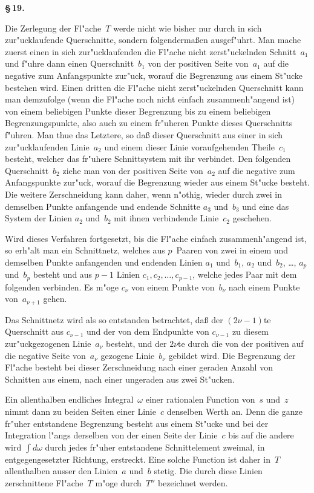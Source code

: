 \documentclass[12pt,a4paper]{book}
\theoremstyle{definition}
\theoremstyle{remark}
\begin{document}
\medskip
\textbf{\S\,19.}

Die Zerlegung der Fl"ache~$T$ werde nicht wie bisher nur durch in
sich zur"ucklaufende Querschnitte, sondern folgenderma\ss{}en ausgef"uhrt.
Man mache zuerst einen in sich zur"ucklaufenden die Fl"ache nicht
zerst"uckelnden Schnitt~$a_1$ und f"uhre dann einen Querschnitt~$b_1$ von der
positiven Seite von~$a_1$ auf die negative zum Anfangspunkte zur"uck,
worauf die Begrenzung aus einem St"ucke bestehen wird. Einen dritten
die Fl"ache nicht zerst"uckelnden Querschnitt kann man demzufolge (wenn
die Fl"ache noch nicht einfach zusammenh"angend ist) von einem beliebigen
Punkte dieser Begrenzung bis zu einem beliebigen Begrenzungspunkte,
also auch zu einem fr"uheren Punkte dieses Querschnitts f"uhren. Man
thue das Letztere, so da\ss{} dieser Querschnitt aus einer in sich
zur"ucklaufenden Linie~$a_2$ und einem dieser Linie voraufgehenden Theile~$c_1$
besteht, welcher das fr"uhere Schnittsystem mit ihr verbindet. Den
folgenden Querschnitt~$b_2$ ziehe man von der positiven Seite von~$a_2$ auf
die negative zum Anfangspunkte zur"uck, worauf die Begrenzung wieder
aus einem St"ucke besteht. Die weitere Zerschneidung kann daher, wenn
n"othig, wieder durch zwei in demselben Punkte anfangende und endende
Schnitte $a_3$ und~$b_3$ und eine das System der Linien $a_2$ und~$b_2$ mit
ihnen verbindende Linie~$c_2$ geschehen.

Wird dieses Verfahren fortgesetzt, bis die Fl"ache einfach zusammenh"angend
ist, so erh"alt man ein Schnittnetz, welches aus $p$~Paaren von zwei in
einem und demselben Punkte anfangenden und endenden Linien
$a_1$ und~$b_1$, $a_2$ und~$b_2$, \ldots, $a_p$ und~$b_p$ besteht und aus $p - 1$
Linien $c_1, c_2, \ldots, c_{p-1}$, welche jedes Paar mit dem folgenden verbinden.
Es m"oge $c_\nu$ von einem Punkte von~$b_\nu$ nach einem Punkte von~$a_{\nu+1}$
gehen.

Das Schnittnetz wird als so entstanden betrachtet, da\ss{} der
$(2\nu - 1)$te Querschnitt aus $c_{\nu-1}$ und der von dem Endpunkte von
$c_{\nu-1}$ zu diesem zur"uckgezogenen Linie~$a_\nu$ besteht, und der $2\nu$te
durch die von der positiven auf die negative Seite von~$a_\nu$ gezogene
Linie~$b_\nu$ gebildet wird. Die Begrenzung der Fl"ache besteht bei dieser
Zerschneidung nach einer geraden Anzahl von Schnitten aus einem, nach
einer ungeraden aus zwei St"ucken.

Ein allenthalben endliches Integral~$\omega$ einer rationalen Function von~$s$
und~$z$ nimmt dann zu beiden Seiten einer Linie~$c$ denselben Werth an.
Denn die ganze fr"uher entstandene Begrenzung besteht aus einem St"ucke
und bei der Integration l"angs derselben von der einen Seite der Linie~$c$
bis auf die andere wird $\int d\omega$ durch jedes fr"uher entstandene
Schnittelement zweimal, in entgegengesetzter Richtung, erstreckt.
Eine solche Function ist daher in~$T$ allenthalben ausser den Linien~$a$
und~$b$ stetig. Die durch diese Linien zerschnittene Fl"ache~$T$ m"oge
durch~$T''$ bezeichnet werden.
\end{document}
